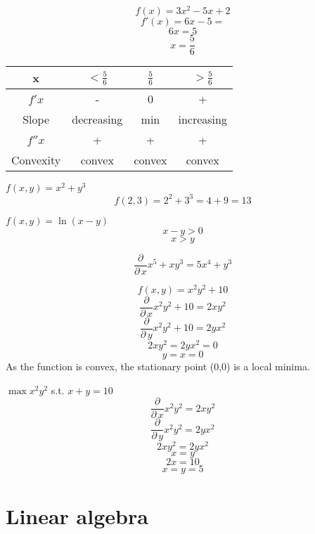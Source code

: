 \documentclass[10pt]{article}
\newenvironment{problem}[2][Problem]{\begin{trivlist}
\item[\hskip \labelsep {\bfseries #1}\hskip \labelsep {\bfseries #2.}]}{\end{trivlist}}
\begin{document}
\begin{problem}{3.7}

$$f(x)=3x^2-5x+2$$
$$f'(x)=6x-5=$$
$$6x=5$$
$$x=\frac{5}{6}$$

\begin{center}
 \begin{tabular}{||c c c c||} 
 \hline
 x & $<\frac{5}{6}$ & $\frac{5}{6}$ & $>\frac{5}{6}$ \\ [0.5ex] 
 \hline\hline
 $f'{x}$ & - & 0 & + \\
 \hline
 Slope & decreasing & min & increasing \\
 \hline
 $f''{x}$ & + & + & + \\
 \hline
 Convexity & convex & convex & convex \\ [1ex] 
 \hline
\end{tabular}
\end{center}
\end{problem}

\begin{problem}{3.8}
$f(x,y)=x^2+y^3$ 
$$f(2,3)=2^2+3^3=4+9=13$$
\end{problem}

\begin{problem}{3.9}
$f(x,y)=\ln(x-y)$
$$x-y>0$$
$$x>y$$
\end{problem}

\begin{problem}{3.10}
$$\frac{\partial}{\partial \, x} x^5+xy^3=5x^4+y^3$$
\end{problem}

\begin{problem}{3.11}
$$f(x,y)=x^2y^2+10$$
$$\frac{\partial}{\partial \, x} x^2y^2+10=2xy^2$$
$$\frac{\partial}{\partial \, y} x^2y^2+10=2yx^2$$
$$2xy^2=2yx^2=0$$
$$y=x=0$$
As the function is convex, the stationary point (0,0) is a local minima.
\end{problem}

\begin{problem}{3.12}

$\max x^2y^2$ s.t. $x+y=10$
$$\frac{\partial}{\partial \, x} x^2y^2=2xy^2$$
$$\frac{\partial}{\partial \, y} x^2y^2=2yx^2$$
$$2xy^2=2yx^2$$
$$x=y$$
$$2x=10$$
$$x=y=5$$
\end{problem}

\section{Linear algebra}
\end{document}

